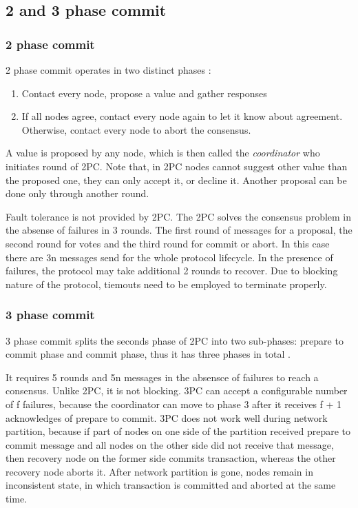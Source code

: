 \documentclass[runningheads,a4paper]{llncs}
\begin{document}
\subsection{2 and 3 phase commit}
\subsubsection{2 phase commit}
2 phase commit operates in two distinct phases \cite{Bernstein:1987}: 
\begin{enumerate} 
	\item Contact every node, propose a value and gather responses 
	\item If all nodes agree, contact every node again to let it know about 
		  agreement. Otherwise, contact every node to abort the consensus. 
\end{enumerate}

A value is proposed by any node, which is then called the \emph{coordinator} who
initiates round of 2PC. Note that, in 2PC nodes cannot suggest other value than
the proposed one, they can only accept it, or decline it. Another proposal can
be done only through another round. 

Fault tolerance is not provided by 2PC. The 2PC solves the consensus problem in
the absense of failures in 3 rounds. The first  round of messages for a
proposal, the second round for votes and the third round for commit or abort. In
this case there are 3n messages send for the whole protocol lifecycle. In the
presence of failures,  the protocol may take additional 2 rounds to recover. Due
to blocking nature of the protocol, tiemouts  need to be employed to terminate
properly.

\subsubsection{3 phase commit}
3 phase commit splits the seconds phase of 2PC into two sub-phases: prepare to
commit phase and commit phase, thus it has three phases in total
\cite{Bernstein:1987}.

It requires 5 rounds and 5n messages in the absensce of failures to reach a
consensus.  Unlike 2PC, it is not blocking. 3PC can accept a configurable number
of f failures, because the coordinator can move to phase 3 after it receives f +
1 acknowledges of prepare to commit. 3PC does not work well during network
partition, because if part of nodes on one side of the partition received
prepare to commit message and all nodes on the other side did not receive that
message, then recovery node on the former side commits transaction, whereas the
other recovery node aborts it. After network partition is gone, nodes remain in
inconsistent state, in which transaction is committed and aborted at the same
time.
\end{document}

